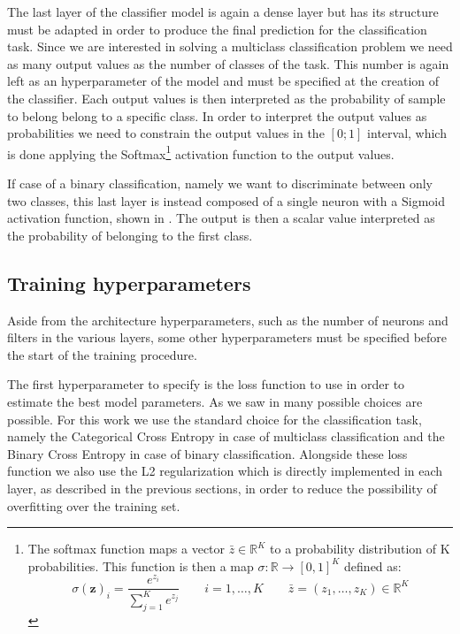 The last layer of the classifier model is again a dense layer but has its structure must be adapted in order to produce the final prediction for the classification task. 
Since we are interested in solving a multiclass classification problem we need as many output values as the number of classes of the task. This number is again left as an hyperparameter of the model and must be specified at the creation of the classifier. Each output values is then interpreted as the probability of sample to belong belong to a specific class. In order to interpret the output values as probabilities we need to constrain the output values in the $[0;1]$ interval, which is done applying the Softmax\footnote{The softmax function maps a vector $\bar{z}\in \mathbb{R}^K$ to a probability distribution of K probabilities. This function is then a map $\sigma:\mathbb{R}\to[0,1]^K$ defined as:
\begin{equation}
\sigma(\mathbf{z})_{i}=\frac{e^{z_{i}}}{\sum_{j=1}^{K} e^{z_{j}}} \quad \quad i=1, \ldots, K \qquad\bar{z}=\left(z_{1}, \ldots, z_{K}\right) \in \mathbb{R}^{K}
\end{equation}} activation function to the output values.

If case of a binary classification, namely we want to discriminate between only two classes, this last layer is instead composed of a single neuron with a Sigmoid activation function, shown in . The output is then a scalar value interpreted as the probability of belonging to the first class.

\subsection{Training hyperparameters}

Aside from the architecture hyperparameters, such as the number of neurons and filters in the various layers, some other hyperparameters must be specified before the start of the training procedure. 

The first hyperparameter to specify is the loss function to use in order to estimate the best model parameters. As we saw in  many possible choices are possible. For this work we use the standard choice for the classification task, namely the Categorical Cross Entropy in case of multiclass classification and the Binary Cross Entropy in case of binary classification. Alongside these loss function we also use the L2 regularization which is directly implemented in each layer, as described in the previous sections, in order to reduce the possibility of overfitting over the training set.

